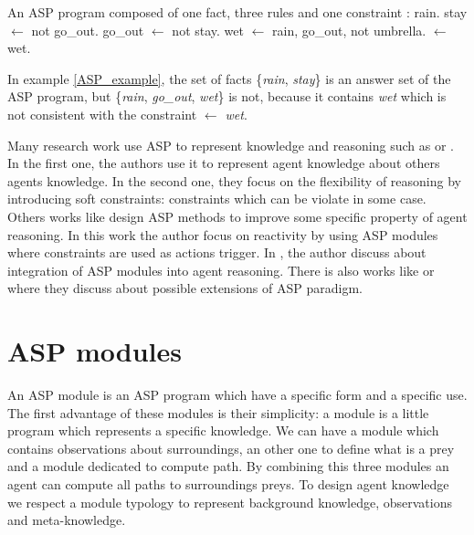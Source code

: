 \documentclass{aamas2012}
\begin{document}
	\begin{example}
		\label{ASP_example}
		An ASP program composed of one fact, three rules and one constraint :\newline
		\newline
		rain.\newline
		stay $\leftarrow$ not go\_out.\newline
		go\_out $\leftarrow$ not stay.\newline
		wet $\leftarrow$ rain, go\_out, not umbrella.\newline
		$\leftarrow$ wet.
	\end{example}
	
	In example \ref{ASP_example}, the set of facts \{\emph{rain}, \emph{stay}\} is an answer set of the ASP program, but \{\emph{rain}, \emph{go\_out}, \emph{wet}\} is not, 
	because it contains \emph{wet} which is not consistent with the constraint \emph{$\leftarrow$ wet}.
	
	Many research work use ASP to represent knowledge and reasoning such as \cite{DBLP:conf/atal/BaralGSP10} or \cite{DBLP:conf/clima/NieuwenborghVHV06}.
	In the first one, the authors use it to represent agent knowledge about others agents knowledge.
	In the second one, they focus on the flexibility of reasoning by introducing soft constraints: constraints which can be violate in some case.
	Others works like \cite{DBLP:conf/datalog/Costantini10} design ASP methods to improve some specific property of agent reasoning.
	In this work the author focus on reactivity by using ASP modules where constraints are used as actions trigger.
	In \cite{DBLP:conf/lpnmr/Costantini09}, the author discuss about integration of ASP modules into agent reasoning.
	There is also works like \cite{DBLP:conf/aaaiss/BaralAD06} or \cite{DBLP:conf/birthday/FaberW11} where they discuss about possible extensions of ASP paradigm.

\section{ASP modules}

	An ASP module is an ASP program which have a specific form and a specific use.
	The first advantage of these modules is their simplicity: a module is a little program which represents a specific knowledge.
	We can have a module which contains observations about surroundings,
	an other one to define what is a prey and a module dedicated to compute path.
	By combining this three modules an agent can compute all paths to surroundings preys.
	To design agent knowledge we respect a module typology to represent background knowledge, observations and meta-knowledge.
\end{document}
